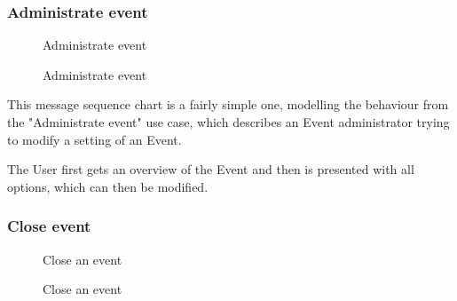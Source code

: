 	\subsubsection{Administrate event}
		\begin{figure}[H]
			\centering
			\begin{msc}{Administrate event}

				\nextlevel
				\nextlevel
				\nextlevel
			\end{msc}
			\caption{Administrate event}
			\label{msc:adminevent}
		\end{figure}

		This message sequence chart is a fairly simple one, modelling the behaviour from the "Administrate event" use case, which describes an Event administrator trying to modify a setting of an Event.

		The User first gets an overview of the Event and then is presented with all options, which can then be modified.

	\subsubsection{Close event}
		\begin{figure}[H]
			\centering
			\begin{msc}{Close an event}

				\nextlevel
				\nextlevel
				\nextlevel

				\nextlevel
				\nextlevel
				\nextlevel
				\nextlevel
				\nextlevel
				\nextlevel
				\nextlevel
			\end{msc}
			\caption{Close an event}
			\label{msc:closeevent}
		\end{figure}
